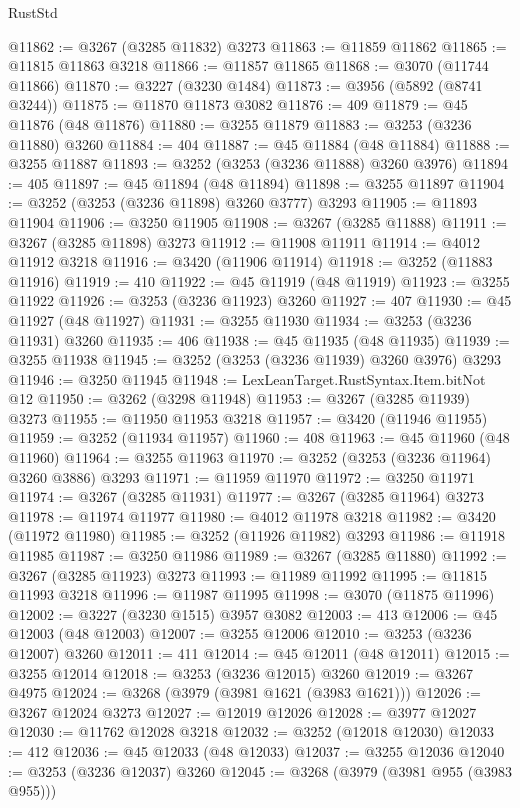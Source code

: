 \begin{lexlean}{RustStd}
\begin{coremodule}
@11862 := @3267 (@3285 @11832) @3273
@11863 := @11859 @11862
@11865 := @11815 @11863 @3218
@11866 := @11857 @11865
@11868 := @3070 (@11744 @11866)
@11870 := @3227 (@3230 @1484)
@11873 := @3956 (@5892 (@8741 @3244))
@11875 := @11870 @11873 @3082
@11876 := 409
@11879 := @45 @11876 (@48 @11876)
@11880 := @3255 @11879
@11883 := @3253 (@3236 @11880) @3260
@11884 := 404
@11887 := @45 @11884 (@48 @11884)
@11888 := @3255 @11887
@11893 := @3252 (@3253 (@3236 @11888) @3260 @3976)
@11894 := 405
@11897 := @45 @11894 (@48 @11894)
@11898 := @3255 @11897
@11904 := @3252 (@3253 (@3236 @11898) @3260 @3777) @3293
@11905 := @11893 @11904
@11906 := @3250 @11905
@11908 := @3267 (@3285 @11888)
@11911 := @3267 (@3285 @11898) @3273
@11912 := @11908 @11911
@11914 := @4012 @11912 @3218
@11916 := @3420 (@11906 @11914)
@11918 := @3252 (@11883 @11916)
@11919 := 410
@11922 := @45 @11919 (@48 @11919)
@11923 := @3255 @11922
@11926 := @3253 (@3236 @11923) @3260
@11927 := 407
@11930 := @45 @11927 (@48 @11927)
@11931 := @3255 @11930
@11934 := @3253 (@3236 @11931) @3260
@11935 := 406
@11938 := @45 @11935 (@48 @11935)
@11939 := @3255 @11938
@11945 := @3252 (@3253 (@3236 @11939) @3260 @3976) @3293
@11946 := @3250 @11945
@11948 := LexLeanTarget.RustSyntax.Item.bitNot @12
@11950 := @3262 (@3298 @11948)
@11953 := @3267 (@3285 @11939) @3273
@11955 := @11950 @11953 @3218
@11957 := @3420 (@11946 @11955)
@11959 := @3252 (@11934 @11957)
@11960 := 408
@11963 := @45 @11960 (@48 @11960)
@11964 := @3255 @11963
@11970 := @3252 (@3253 (@3236 @11964) @3260 @3886) @3293
@11971 := @11959 @11970
@11972 := @3250 @11971
@11974 := @3267 (@3285 @11931)
@11977 := @3267 (@3285 @11964) @3273
@11978 := @11974 @11977
@11980 := @4012 @11978 @3218
@11982 := @3420 (@11972 @11980)
@11985 := @3252 (@11926 @11982) @3293
@11986 := @11918 @11985
@11987 := @3250 @11986
@11989 := @3267 (@3285 @11880)
@11992 := @3267 (@3285 @11923) @3273
@11993 := @11989 @11992
@11995 := @11815 @11993 @3218
@11996 := @11987 @11995
@11998 := @3070 (@11875 @11996)
@12002 := @3227 (@3230 @1515) @3957 @3082
@12003 := 413
@12006 := @45 @12003 (@48 @12003)
@12007 := @3255 @12006
@12010 := @3253 (@3236 @12007) @3260
@12011 := 411
@12014 := @45 @12011 (@48 @12011)
@12015 := @3255 @12014
@12018 := @3253 (@3236 @12015) @3260
@12019 := @3267 @4975
@12024 := @3268 (@3979 (@3981 @1621 (@3983 @1621)))
@12026 := @3267 @12024 @3273
@12027 := @12019 @12026
@12028 := @3977 @12027
@12030 := @11762 @12028 @3218
@12032 := @3252 (@12018 @12030)
@12033 := 412
@12036 := @45 @12033 (@48 @12033)
@12037 := @3255 @12036
@12040 := @3253 (@3236 @12037) @3260
@12045 := @3268 (@3979 (@3981 @955 (@3983 @955)))

\end{coremodule}
\end{lexlean}
